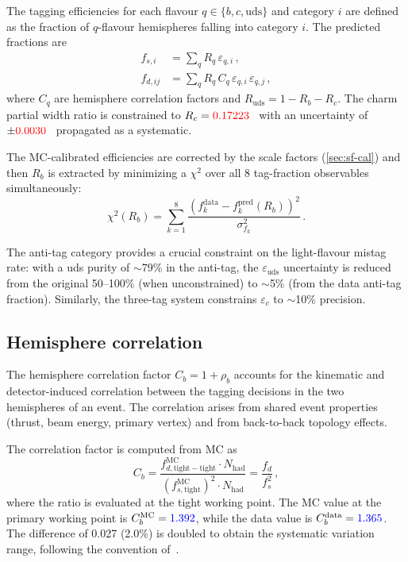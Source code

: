 \documentclass[11pt,a4paper]{article}
\newcommand{\measured}[1]{\textcolor{blue}{#1}}
\newcommand{\external}[1]{\textcolor{red}{#1}}
\begin{document}
The tagging efficiencies for each flavour $q \in \{b, c, \mathrm{uds}\}$
and category $i$ are defined as the fraction of $q$-flavour hemispheres
falling into category $i$.  The predicted fractions are
\begin{align}
  f_{s,i}   &= \sum_q R_q\, \varepsilon_{q,i}\,, \label{eq:fs}\\
  f_{d,ij}  &= \sum_q R_q\, C_q\, \varepsilon_{q,i}\, \varepsilon_{q,j}\,,
  \label{eq:fd}
\end{align}
where $C_q$ are hemisphere correlation factors and $R_\mathrm{uds} =
1 - R_b - R_c$.  The charm partial width ratio is constrained to
$R_c = \external{0.17223}$~\cite{LEP:EWWG:2005} with an uncertainty
of $\pm\external{0.0030}$~\cite{LEP:EWWG:2005} propagated as a
systematic.

The MC-calibrated efficiencies are corrected by the scale factors
(\cref{sec:sf-cal}) and then $R_b$ is extracted by minimizing a
$\chi^2$ over all 8 tag-fraction observables simultaneously:
\begin{equation}
  \chi^2(R_b) = \sum_{k=1}^{8}
    \frac{\left(f_k^\mathrm{data} - f_k^\mathrm{pred}(R_b)\right)^2}
         {\sigma_{f_k}^2}\,.
  \label{eq:chi2-3tag}
\end{equation}

The anti-tag category provides a crucial constraint on the light-flavour
mistag rate: with a uds purity of $\sim$79\% in the anti-tag, the
$\varepsilon_\mathrm{uds}$ uncertainty is reduced from the original
50--100\% (when unconstrained) to $\sim$5\% (from the data anti-tag
fraction).  Similarly, the three-tag system constrains $\varepsilon_c$
to $\sim$10\% precision.

\subsection{Hemisphere correlation}
\label{sec:hemisphere-corr}

The hemisphere correlation factor $C_b = 1 + \rho_b$ accounts for the
kinematic and detector-induced correlation between the tagging decisions
in the two hemispheres of an event.  The correlation arises from shared
event properties (thrust, beam energy, primary vertex) and from
back-to-back topology effects.

The correlation factor is computed from MC as
\begin{equation}
  C_b = \frac{f_{d,\mathrm{tight-tight}}^\mathrm{MC} \cdot N_\mathrm{had}}
       {(f_{s,\mathrm{tight}}^\mathrm{MC})^2 \cdot N_\mathrm{had}}
     = \frac{f_d}{f_s^2}\,,
  \label{eq:cb}
\end{equation}
where the ratio is evaluated at the tight working point.  The MC value
at the primary working point is $C_b^\mathrm{MC} = \measured{1.392}$,
while the data value is $C_b^\mathrm{data} = \measured{1.365}$.  The
difference of 0.027 (2.0\%) is doubled to obtain the systematic variation
range, following the convention of~\cite{ALEPH:Rb:1996}.
\end{document}
